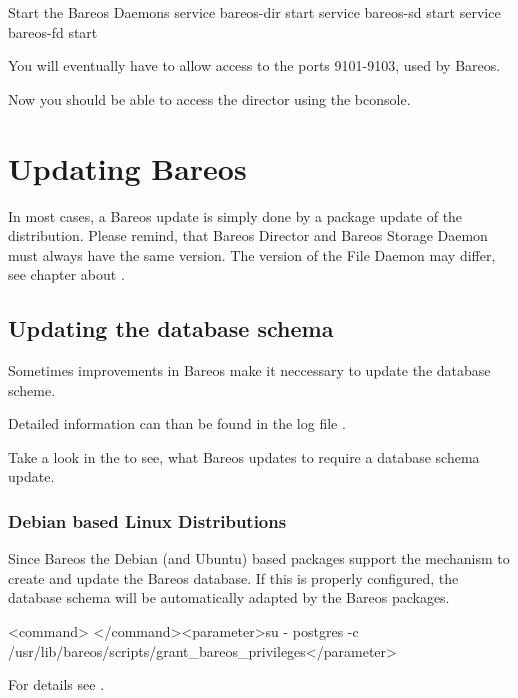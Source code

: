 \begin{commands}{Start the Bareos Daemons}
service bareos-dir start
service bareos-sd start
service bareos-fd start
\end{commands}

You will eventually have to allow access to the ports 9101-9103, used by Bareos.

Now you should be able to access the director using the bconsole.

\chapter{Updating Bareos}
\label{bareos-update}

In most cases, a Bareos update is simply done by a package update of the distribution.
Please remind, that Bareos Director and Bareos Storage Daemon must always have the same version.
The version of the File Daemon may differ, see chapter about .

\section{Updating the database schema}

Sometimes improvements in Bareos make it neccessary to update the database scheme.


Detailed information can than be found in the log file \logfileUnix.

Take a look in the  to see, what Bareos updates to require a database schema update.


\subsection{Debian based Linux Distributions}

Since Bareos  the Debian (and Ubuntu) based packages support the  mechanism to create and update the Bareos database.
If this is properly configured, the database schema will be automatically adapted by the Bareos packages.

\begin{commands}{}
<command> </command><parameter>su - postgres -c /usr/lib/bareos/scripts/grant_bareos_privileges</parameter>
\end{commands}
For details see .

